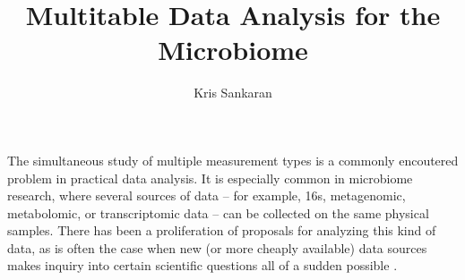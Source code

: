 \documentclass{article}
\title{Multitable Data Analysis for the Microbiome}
\author{Kris Sankaran}
\begin{document}
\maketitle

The simultaneous study of multiple measurement types is a commonly encoutered
problem in practical data analysis. It is especially common in microbiome
research, where several sources of data -- for example, 16s, metagenomic,
metabolomic, or transcriptomic data -- can be collected on the same physical
samples\citep{Franzosa2015, McHardy2013}. There has been a proliferation of
proposals for analyzing this kind of data, as is often the case when new (or
more cheaply available) data sources makes inquiry into certain scientific
questions all of a sudden possible \citep{Fukuyama2017, Rahnavard2017,
  Chaudhary2017, Chalise2017}.



\end{document}
